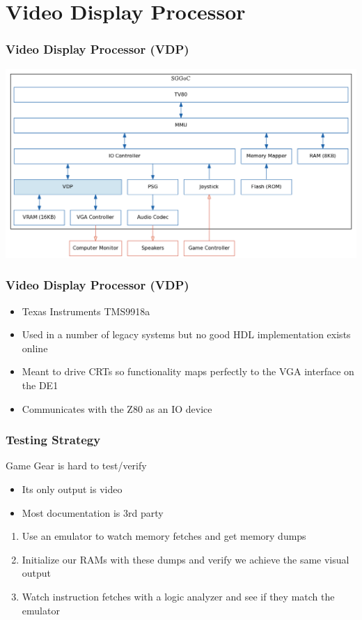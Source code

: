 \documentclass{beamer}
\newlength{\wideitemsep}
\let\olditem\item
\renewcommand{\item}{\setlength{\itemsep}{\wideitemsep}\olditem}
\begin{document}
\section{Video Display Processor}
\begin{frame}
    \frametitle{Video Display Processor (VDP)}
    \begin{center}
        \includegraphics[width=\textwidth]{../block_diagrams/block_diagram_internal_vdp.png}
    \end{center}
\end{frame}

\begin{frame}
    \frametitle{Video Display Processor (VDP)}

    \begin{itemize}
        \item<1-> Texas Instruments TMS9918a
        \item<2-> Used in a number of legacy systems but no good HDL implementation exists online
        \item<3-> Meant to drive CRTs so functionality maps perfectly to the VGA interface on the DE1
        \item<4-> Communicates with the Z80 as an IO device
    \end{itemize}
    \vspace{0.5cm}

\end{frame}

\begin{frame}
    \frametitle{Testing Strategy}
    Game Gear is hard to test/verify
    \begin{itemize}
        \olditem<2-> Its only output is video
        \olditem<3-> Most documentation is 3rd party
    \end{itemize}
    \vspace{0.25cm}
    \begin{enumerate}
        \olditem<4-> Use an emulator to watch memory fetches and get memory dumps
        \olditem<5-> Initialize our RAMs with these dumps and verify we achieve the same visual output
        \olditem<6-> Watch instruction fetches with a logic analyzer and see if they match the emulator
    \end{enumerate}
    \vspace{0.25cm}
\end{frame}
\end{document}
